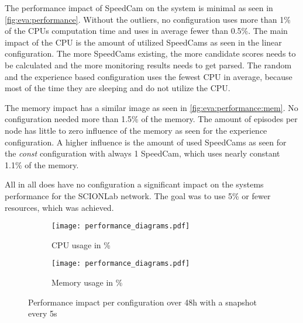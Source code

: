 \documentclass[thesis.tex]{subfiles}
\begin{document}
The performance impact of SpeedCam on the system is minimal as seen in \autoref{fig:eva:performance}. Without the outliers, no configuration uses more than 1\% of the CPUs computation time and uses in average fewer than 0.5\%. The main impact of the CPU is the amount of utilized SpeedCams as seen in the linear configuration. The more SpeedCams existing, the more candidate scores needs to be calculated and the more monitoring results needs to get parsed. The random and the experience based configuration uses the fewest CPU in average, because most of the time they are sleeping and do not utilize the CPU.

The memory impact has a similar image as seen in \autoref{fig:eva:performance:mem}. No configuration needed more than 1.5\% of the memory. The amount of episodes per node has little to zero influence of the memory as seen for the experience configuration. A higher influence is the amount of used SpeedCams as seen for the \textit{const} configuration with always 1 SpeedCam, which uses nearly constant 1.1\% of the memory.

All in all does have no configuration a significant impact on the systems performance for the SCIONLab network. The goal was to use 5\% or fewer resources, which was achieved.
\begin{figure}
	\centering
	\begin{subfigure}{0.48\linewidth}
		\centering
		\texttt{[image: performance\_diagrams.pdf]}
		\caption{CPU usage in \%}
		\label{fig:eva:performance:cpu}
	\end{subfigure}
	\hfill
	\begin{subfigure}{0.48\linewidth}
		\centering
		\texttt{[image: performance\_diagrams.pdf]}
		\caption{Memory usage in \%}
		\label{fig:eva:performance:mem}
	\end{subfigure}
	\caption{Performance impact per configuration over 48h with a snapshot every 5s}
	\label{fig:eva:performance}
\end{figure}

\subfilebib %
\end{document}
